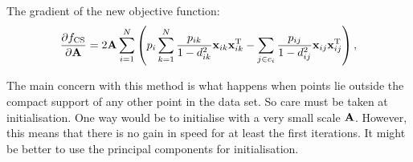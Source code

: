 The gradient of the new objective function:
\begin{align}
	\frac{\partial f_\text{CS}}{\partial \mathbf{A}}=2\mathbf{A}\sum_{i=1}^{N}
	\left(
	p_i \sum_{k=1}^N \frac{p_{ik}}{1-d_{ik}^2} \mathbf{x}_{ik}\mathbf{x}_{ik}^{\textrm{T}}
	- \sum_{j\in c_i} \frac{p_{ij}}{1-d_{ij}^2}\mathbf{x}_{ij}\mathbf{x}_{ij}^{\textrm{T}} 
	\right)
	\label{eq:nca-cs-grad},
\end{align}

The main concern with this method is what happens when points lie outside the compact support of any other point in the data set. So care must be taken at initialisation. One way would be to initialise with a very small scale $\mathbf{A}$. However, this means that there is no gain in speed for at least the first iterations. It might be better to use the principal components for initialisation. 

